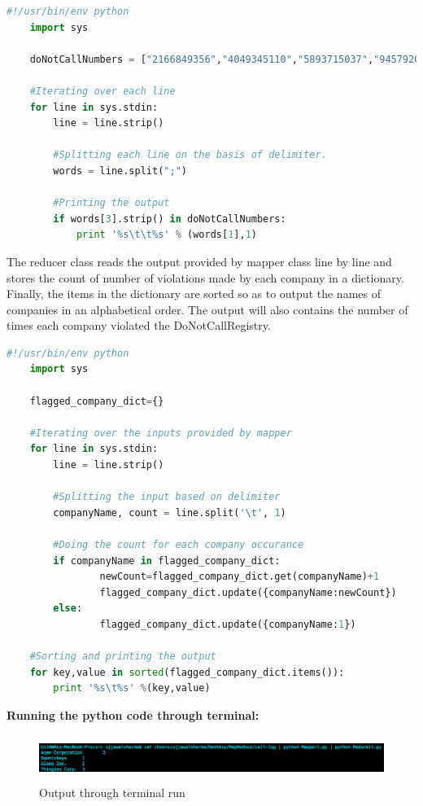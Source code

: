 \documentclass[a4paper, 10pt]{article}
\begin{document}
\begin{lstlisting}[language=Python, caption=Mapper for problem 1]
    #!/usr/bin/env python
    import sys
    
    doNotCallNumbers = ["2166849356","4049345110","5893715037","9457920329"]

    #Iterating over each line
    for line in sys.stdin:
        line = line.strip()

        #Splitting each line on the basis of delimiter.
        words = line.split(";")

        #Printing the output
        if words[3].strip() in doNotCallNumbers:
            print '%s\t\t%s' % (words[1],1)       
\end{lstlisting}

The reducer class reads the output provided by mapper class line by line and stores the count of number of violations made by each company in a dictionary. Finally, the items in the dictionary are sorted so as to output the names of companies in an alphabetical order. The output will also contains the number of times each company violated the DoNotCallRegistry.

\begin{lstlisting}[language=Python, caption=Reducer for problem 1]
    #!/usr/bin/env python
    import sys
    
    flagged_company_dict={}

    #Iterating over the inputs provided by mapper
    for line in sys.stdin:
        line = line.strip()

        #Splitting the input based on delimiter
        companyName, count = line.split('\t', 1)

        #Doing the count for each company occurance
        if companyName in flagged_company_dict:
                newCount=flagged_company_dict.get(companyName)+1
                flagged_company_dict.update({companyName:newCount}) 
        else:
                flagged_company_dict.update({companyName:1})

    #Sorting and printing the output        
    for key,value in sorted(flagged_company_dict.items()):
        print '%s\t%s' %(key,value)            
\end{lstlisting}

\noindent
\textbf{Running the python code through terminal:}
\begin{figure}[!htbp]
    \centering
    \includegraphics[height=1.5cm]{Question1.png}
    \caption{Output through terminal run}
\end{figure}
\end{document}
